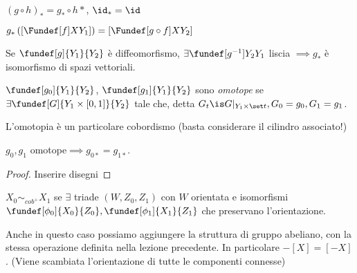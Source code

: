 

\begin{oss}
 $(g\circ h )_* = g_*\circ h*$,
 $\id_* = \id$
\end{oss}
$g_*\left(\left[\Fundef[f]X{Y_1} \right]\right) = \left[\Fundef[g\circ f]X {Y_2} \right]$
\begin{oss}
 Se $\fundef[g]{Y_1}{Y_2}$ è diffeomorfismo, $\exists \fundef[g^{-1}]{Y_2}{Y_1}$ liscia $\implies g_*$ è isomorfismo di spazi vettoriali.
\end{oss}
\begin{defn}[Omotopia]
 $\fundef[g_0]{Y_1}{Y_2}$, $\fundef[g_1]{Y_1}{Y_2}$ sono \emph{omotope} se $\exists \fundef[G]{Y_1\times\left[ 0,1\right]}{Y_2}$ tale che,
 detta $G_t\is  G|_{Y_1\times \set t}, G_0=g_0, G_1=g_1$.
\end{defn}
 \begin{oss}
  L'omotopia è un particolare cobordismo (basta considerare il cilindro associato!)
 \end{oss}
\begin{prop}
 $g_0, g_1$ omotope$\implies g_{0*}=g_{1*}$.
\end{prop}
\begin{proof}
 Inserire disegni
\end{proof}
\begin{defn}
 $X_0\sim_{cob^+}X_1$ se $\exists$ triade $(W, Z_0, Z_1)$ con $W$ orientata e isomorfismi $\fundef[\phi_0]{X_0}{Z_0}, \fundef[\phi_1]{X_1}{Z_1}$
 che preservano l'orientazione.
\end{defn}
\begin{oss}
 Anche in questo caso possiamo aggiungere la struttura di gruppo abeliano, con la stessa operazione definita nella lezione precedente.
 In particolare $-\left[ X\right]=\left[-X\right]$. (Viene scambiata l'orientazione di tutte le componenti connesse)
\end{oss}
